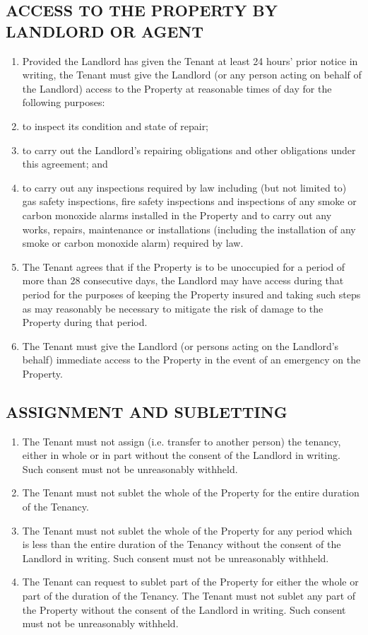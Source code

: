 \subsection{ACCESS TO THE PROPERTY BY LANDLORD OR AGENT}

\begin{enumerate}
\item{Provided the Landlord has given the Tenant at least 24 hours' prior notice in writing, the Tenant must give the Landlord (or any person acting on behalf of the Landlord) access to the Property at reasonable times of day for the following purposes:}
\item{to inspect its condition and state of repair;}

\item{to carry out the Landlord's repairing obligations and other obligations under this agreement; and}
\item{to carry out any inspections required by law including (but not limited to) gas safety inspections, fire safety inspections and inspections of any smoke or carbon monoxide alarms installed in the Property and to carry out any works, repairs, maintenance or installations (including the installation of any smoke or carbon monoxide alarm) required by law.}

\item{The Tenant agrees that if the Property is to be unoccupied for a period of more than 28 consecutive days, the Landlord may have access during that period for the purposes of keeping the Property insured and taking such steps as may reasonably be necessary to mitigate the risk of damage to the Property during that period.}
\item{The Tenant must give the Landlord (or persons acting on the Landlord's behalf) immediate access to the Property in the event of an emergency on the Property.}
\end{enumerate}

\subsection{ASSIGNMENT AND SUBLETTING}
\begin{enumerate}

\item{The Tenant must not assign (i.e. transfer to another person) the tenancy, either in whole or in part without the consent of the Landlord in writing. Such consent must not be unreasonably withheld.}
\item{The Tenant must not sublet the whole of the Property for the entire duration of the Tenancy.}
\item{The Tenant must not sublet the whole of the Property for any period which is less than the entire duration of the Tenancy without the consent of the Landlord in writing. Such consent must not be unreasonably withheld.}
\item{The Tenant can request to sublet part of the Property for either the whole or part of the duration of the Tenancy. The Tenant must not sublet any part of the Property without the consent of the Landlord in writing. Such consent must not be unreasonably withheld.}

\end{enumerate}

